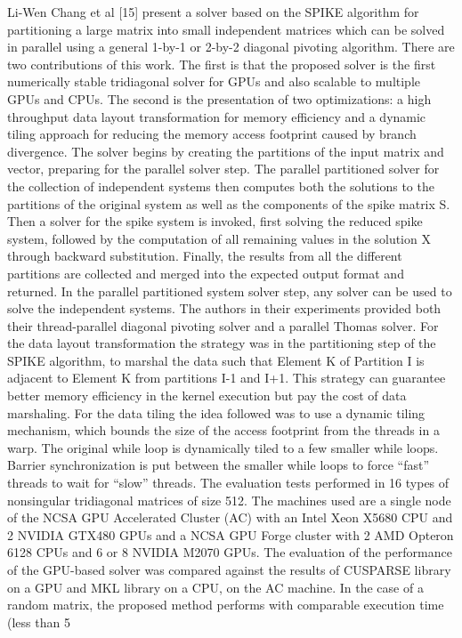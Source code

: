 Li-Wen Chang et al [15] present a solver based on the SPIKE algorithm for partitioning a large matrix into small independent matrices which can be solved in parallel using a general 1-by-1 or 2-by-2 diagonal pivoting algorithm. There are two contributions of this work. The first is that the proposed solver is the first numerically stable tridiagonal solver for GPUs and also scalable to multiple GPUs and CPUs. The second is the presentation of two optimizations: a high throughput data layout transformation for memory efficiency and a dynamic tiling approach for reducing the memory access footprint caused by branch divergence. The solver begins by creating the partitions of the input matrix and vector, preparing for the parallel solver step. The parallel partitioned solver for the collection of independent systems then computes both the solutions to the partitions of the original system as well as the components of the spike matrix S.  Then a solver for the spike system is invoked, first solving the reduced spike system, followed by the computation of all remaining values in the solution X through backward substitution. Finally, the results from all the different partitions are collected and merged into the expected output format and returned. In the parallel partitioned system solver step, any solver can be used to solve the independent systems. The authors in their experiments provided both their thread-parallel diagonal pivoting solver and a parallel Thomas solver. For the data layout transformation the strategy was in the partitioning step of the SPIKE algorithm, to marshal the data such that Element K of Partition I is adjacent to Element K from partitions I-1 and I+1. This strategy can guarantee better memory efficiency in the kernel execution but pay the cost of data marshaling. For the data tiling the idea followed was to use a dynamic tiling mechanism, which bounds the size of the access footprint from the threads in a warp. The original while loop is dynamically tiled to a few smaller while loops. Barrier synchronization is put between the smaller while loops to force “fast” threads to wait for “slow” threads. The evaluation tests performed in 16 types of nonsingular tridiagonal matrices of size 512. The machines used are a single node of the NCSA GPU Accelerated Cluster (AC) with an Intel Xeon X5680 CPU and 2 NVIDIA GTX480 GPUs and a NCSA GPU Forge cluster with 2 AMD Opteron 6128 CPUs and 6 or 8 NVIDIA M2070 GPUs. The evaluation of the performance of the GPU-based solver was compared against the results of CUSPARSE library on a GPU and MKL library on a CPU, on the AC machine. In the case of a random matrix, the proposed method performs with comparable execution time (less than 5%